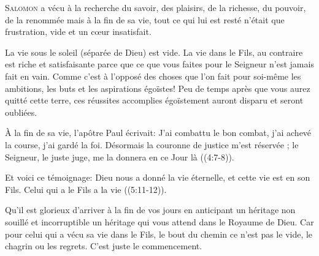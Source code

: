 \lettrine{S}{alomon} a vécu à la recherche du savoir, des plaisirs,
 de la richesse, du pouvoir, de la renommée
 \ocadr mais à la fin de sa vie, tout ce qui lui est resté
 n'était que frustration, vide et un c\oe{}ur insatisfait. 

La vie sous le soleil (séparée de Dieu) est vide.
 La vie dans le Fils, au contraire est riche et satisfaisante
 parce que ce que vous faites pour le Seigneur n'est jamais fait en vain.
 Comme c'est à l'opposé des choses que l'on fait pour soi-même
 \ocadr les ambitions, les buts et les aspirations égoïstes!
 Peu de temps après que vous aurez quitté cette terre,
 ces réussites accomplies égoïstement auront disparu et seront oubliées. 


À la fin de sa vie, l'apôtre Paul écrivait: 
 \Og J'ai combattu le bon combat, j'ai achevé la course, j'ai gardé la foi.
 Désormais la couronne de justice m'est réservée ;
 le Seigneur, le juste juge, me la donnera en ce Jour là \Fg{}
 ((4:7-8)). 

Et voici ce témoignage:
 \Og Dieu nous a donné la vie éternelle, et cette vie est en son Fils.
 Celui qui a le Fils a la vie \Fg{} ((5:11-12)). 

Qu'il est glorieux d'arriver à la fin de vos jours en anticipant un héritage
 non souillé et incorruptible \ocadr un héritage qui vous attend
 dans le Royaume de Dieu.
 Car pour celui qui a vécu sa vie dans le Fils, le bout du chemin
 ce n'est pas le vide, le chagrin ou les regrets. C'est juste le commencement. 

\dvrule






